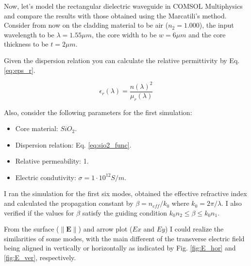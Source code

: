 \documentclass[a4paper,12pt]{article}
\begin{document}
Now, let's model the rectangular dielectric waveguide in COMSOL Multiphysics and compare the results with those obtained using the Marcatili's method. Consider from now on the cladding material to be air ($n_2 = 1.000$), the input wavelength to be $\lambda = 1.55 \mu m$, the core width to be $w = 6 \mu m$ and the core thickness to be $t = 2 \mu m$.

Given the dispersion relation you can calculate the relative permittivity by Eq. \eqref{eq:eps_r}.

\begin{equation}
    \epsilon_r(\lambda) = \frac{n(\lambda)^2}{\mu_r(\lambda)}
    \label{eq:eps_r}
\end{equation}

Also, consider the following parameters for the first simulation:
\begin{itemize}
    \item Core material: $SiO_2$.
    \item Dispersion relation: Eq. \eqref{eq:sio2_func}.
    \item Relative permeability: 1.
    \item Electric condutivity: $\sigma = 1 \cdot 10^{12}S/m$.
\end{itemize}

I ran the simulation for the first six modes, obtained the effective refractive index and calculated the propagation constant by $\beta = n_{eff}/k_0$ where $k_0 = 2\pi / \lambda$. I also verified if the values for $\beta$ satisfy the guiding condition $k_0 n_2 \leq \beta \leq k_0 n_1$. 

From the surface ($\| \mathbf{E} \|$) and arrow plot ($Ex$ and $Ey$) I could realize the similarities of some modes, with the main different of the transverse electric field being aligned in vertically or horizontally as indicated by Fig. \ref{fig:E_hor} and \ref{fig:E_ver}, respectively.
\end{document}
